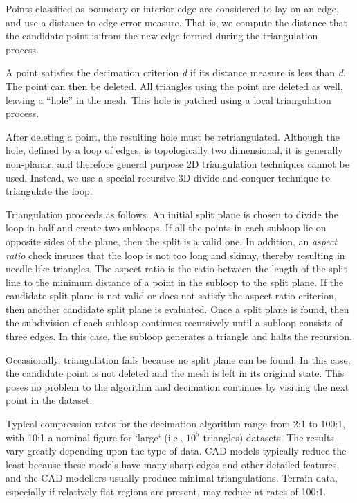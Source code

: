 \begin{description}[leftmargin=0cm,labelindent=0cm]
Points classified as boundary or interior edge are considered to lay on an edge, and use a distance to edge error measure. That is, we compute the distance that the candidate point is from the new edge formed during the triangulation process.

A point satisfies the decimation criterion \emph{d} if its distance measure is less than \emph{d}. The point can then be deleted. All triangles using the point are deleted as well, leaving a ``hole'' in the mesh. This hole is patched using a local triangulation process.

\item[Triangulation.] \label{subsec:decimation.triangulation} After deleting a point, the resulting hole must be retriangulated. Although the hole, defined by a loop of edges, is topologically two dimensional, it is generally non-planar, and therefore general purpose 2D triangulation techniques cannot be used. Instead, we use a special recursive 3D divide-and-conquer technique to triangulate the loop.

Triangulation proceeds as follows. An initial split plane is chosen to divide the loop in half and create two subloops. If all the points in each subloop lie on opposite sides of the plane, then the split is a valid one. In addition, an \emph{aspect ratio} check insures that the loop is not too long and skinny, thereby resulting in needle-like triangles. The aspect ratio is the ratio between the length of the split line to the minimum distance of a point in the subloop to the split plane. If the candidate split plane is not valid or does not satisfy the aspect ratio criterion, then another candidate split plane is evaluated. Once a split plane is found, then the subdivision of each subloop continues recursively until a subloop consists of three edges. In this case, the subloop generates a triangle and halts the recursion.

Occasionally, triangulation fails because no split plane can be found. In this case, the candidate point is not deleted and the mesh is left in its original state. This poses no problem to the algorithm and decimation continues by visiting the next point in the dataset.

\item[Results.] Typical compression rates for the decimation algorithm range from 2:1 to 100:1, with 10:1 a nominal figure for `large` (i.e., $10^5$ triangles) datasets. The results vary greatly depending upon the type of data. CAD models typically reduce the least because these models have many sharp  edges and other detailed features, and the CAD modellers usually produce minimal triangulations. Terrain data, especially if relatively flat regions are present, may reduce at rates of 100:1.


\end{description}

